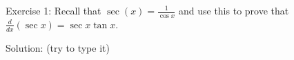 Exercise 1: Recall that $\sec\left(x\right)=\frac{1}{\cos x}$ and use this to prove that $\frac{d}{dx}\left(\sec x\right)=\sec x\tan x$.

Solution: (try to type it)